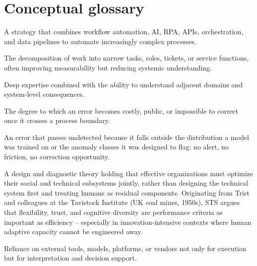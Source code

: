 \documentclass[11pt,a4paper]{article}
\begin{document}
\section{Conceptual glossary}
\begin{description}[leftmargin=2.8cm, style=nextline]
\item[Hyperautomation] A strategy that combines workflow automation, AI, RPA, APIs, orchestration, and data pipelines to automate increasingly complex processes.
\item[Work fragmentation] The decomposition of work into narrow tasks, roles, tickets, or service functions, often improving measurability but reducing systemic understanding.
\item[Connected specialization] Deep expertise combined with the ability to understand adjacent domains and system-level consequences.
\item[Irreversibility] The degree to which an error becomes costly, public, or impossible to correct once it crosses a process boundary.
\item[Silent false negative] An error that passes undetected because it falls outside the distribution a model was trained on or the anomaly classes it was designed to flag: no alert, no friction, no correction opportunity.
\item[Sociotechnical Systems (STS)] A design and diagnostic theory holding that effective organizations must optimize their social and technical subsystems jointly, rather than designing the technical system first and treating humans as residual components. Originating from Trist and colleagues at the Tavistock Institute (UK coal mines, 1950s), STS argues that flexibility, trust, and cognitive diversity are performance criteria as important as efficiency -- especially in innovation-intensive contexts where human adaptive capacity cannot be engineered away.
\item[Cognitive dependency] Reliance on external tools, models, platforms, or vendors not only for execution but for interpretation and decision support.
\end{description}
\end{document}

